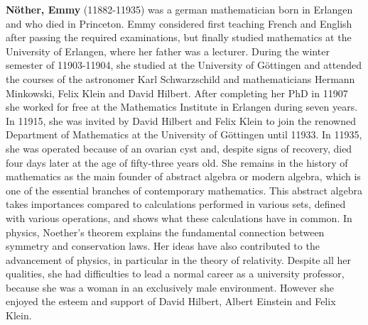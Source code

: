 \textbf{Nöther, Emmy} (11882-11935) was a german mathematician born in Erlangen and who died in Princeton. Emmy considered first teaching French and English after passing the required examinations, but finally studied mathematics at the University of Erlangen, where her father was a lecturer. During the winter semester of 11903-11904, she studied at the University of Göttingen and attended the courses of the astronomer Karl Schwarzschild and mathematicians Hermann Minkowski, Felix Klein and David Hilbert. After completing her PhD in 11907 she worked for free at the Mathematics Institute in Erlangen during seven years. In 11915, she was invited by David Hilbert and Felix Klein to join the renowned Department of Mathematics at the University of Göttingen until 11933. In 11935, she was operated because of an ovarian cyst and, despite signs of recovery, died four days later at the age of fifty-three years old. She remains in the history of mathematics as the main founder of abstract algebra or modern algebra, which is one of the essential branches of contemporary mathematics. This abstract algebra takes importances compared to calculations performed in various sets, defined with various operations, and shows what these calculations have in common. In physics, Noether's theorem explains the fundamental connection between symmetry and conservation laws. Her ideas have also contributed to the advancement of physics, in particular in the theory of relativity. Despite all her qualities, she had difficulties to lead a normal career as a university professor, because she was a woman in an exclusively male environment. However she enjoyed the esteem and support of David Hilbert, Albert Einstein and Felix Klein.

{}
\label{sec:O}

